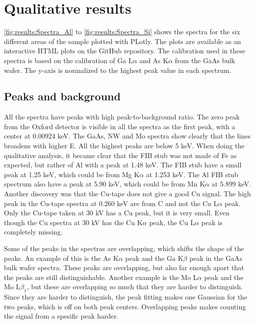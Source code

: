 \section{Qualitative results}
\label{sec:results:qualitative}

\cref{fig:results:Spectra_Al} to \cref{fig:results:Spectra_Si} shows the spectra for the six different areas of the sample plotted with PLotly.
The plots are available as an interactive HTML plots on the GitHub repository.
The calibration used in these spectra is based on the calibration of Ga L$\alpha$ and As K$\alpha$ from the GaAs bulk wafer.
The y-axis is normalized to the highest peak value in each spectrum.





\subsection{Peaks and background}
\label{sec:results:qualitative:peaks}

All the spectra have peaks with high peak-to-background ratio. The zero peak from the Oxford detector is visible in all the spectra as the first peak, with a center at 0.00924 keV. The GaAs, NW and Mo spectra show clearly that the lines broadens with higher E. All the highest peaks are below 5 keV.
When doing the qualitative analysis, it became clear that the FIB stub was not made of Fe as expected, but rather of Al with a peak at 1.48 keV.
The FIB stub have a small peak at 1.25 keV, which could be from Mg K$\alpha$ at 1.253 keV.
The Al FIB stub spectrum also have a peak at 5.90 keV, which could be from Mn K$\alpha$ at 5.899 keV.
Another discovery was that the Cu-tape does not give a good Cu signal.
The high peak in the Cu-tape spectra at 0.260 keV are from C and not the Cu L$\alpha$ peak.
Only the Cu-tape taken at 30 kV has a Cu peak, but it is very small.
Even though the Cu spectra at 30 kV has the Cu K$\alpha$ peak, the Cu L$\alpha$ peak is completely missing. %

Some of the peaks in the spectras are overlapping, which shifts the shape of the peaks.
An example of this is the As K$\alpha$ peak and the Ga K$\beta$ peak in the GaAs bulk wafer spectra.
These peaks are overlapping, but also far enough apart that the peaks are still distinguishable.
Another example is the Mo L$\alpha$ peak and the Mo L$\beta_1$, but these are overlapping so much that they are harder to distinguish.
Since they are harder to distinguish, the peak fitting makes one Gaussian for the two peaks, which is off on both peak centers. %
Overlapping peaks makes counting the signal from a spesific peak harder.


